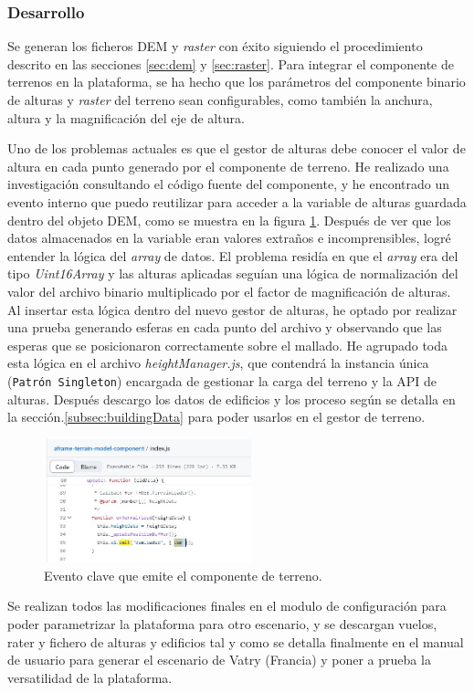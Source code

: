 \documentclass[a4paper, 11pt]{book}
\begin{document}
\subsubsection{Desarrollo}
Se generan los ficheros \textsc{DEM} y \emph{\gls{raster}} con éxito siguiendo el procedimiento descrito en las secciones \ref{sec:dem} y \ref{sec:raster}. 
Para integrar el componente de terrenos en la plataforma, se ha hecho que los parámetros del componente binario de alturas y \emph{raster} del terreno sean configurables, como también la anchura, altura y la magnificación del eje de altura.

Uno de los problemas actuales es que el gestor de alturas debe conocer el valor de altura en cada punto generado por el componente de terreno. He realizado una investigación consultando el código fuente del componente, y he encontrado un evento interno que puedo reutilizar para acceder a la variable de alturas guardada dentro del objeto \textsc{DEM}, como se muestra en la figura \ref{fig:terrain_evento}. Después de ver que los datos almacenados en la variable eran valores extraños e incomprensibles, logré entender la lógica del \emph{array} de datos. 
El problema residía en que el \emph{array} era del tipo \emph{Uint16Array} y las alturas aplicadas seguían una lógica de normalización del valor del archivo binario multiplicado por el factor de magnificación de alturas. Al insertar esta lógica dentro del nuevo gestor de alturas, he optado por realizar una prueba generando esferas en cada punto del archivo y observando que las esperas que se posicionaron correctamente sobre el mallado.
He agrupado toda esta lógica en el archivo \emph{heightManager.js}, que contendrá la instancia única (\texttt{Patrón Singleton}) encargada de gestionar la carga del terreno y la \textsc{\gls{API}} de alturas.
Después descargo los datos de edificios y los proceso según se detalla en la sección.\ref{subsec:buildingData} para poder usarlos en el gestor de terreno.

\begin{figure}[h]
  \centering
  \includegraphics[width=6cm, keepaspectratio]{img/terrain_evento.jpg}
  \caption{Evento clave que emite el componente de terreno.}
  \label{fig:terrain_evento}
\end{figure}
Se realizan todos las modificaciones finales en el modulo de configuración para poder parametrizar la plataforma para otro escenario, y se descargan vuelos, rater y fichero de alturas y edificios tal y como se detalla finalmente en el manual de usuario para generar el escenario de Vatry (Francia) y poner a prueba la versatilidad de la plataforma.
\end{document}
